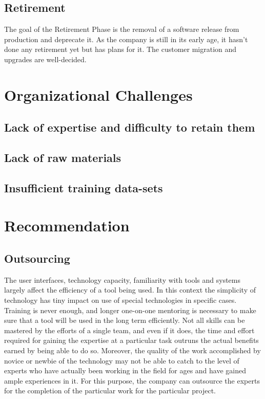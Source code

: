 \documentclass[12pt,a4paper]{scrreprt}
\begin{document}
\section{Retirement}
The goal of the Retirement Phase is the removal of a software release from production and deprecate it. As the company is still in its early age, it hasn't done any retirement yet but has plans for it. The customer migration and upgrades are well-decided.
\chapter{Organizational Challenges}
\section{Lack of expertise and difficulty to retain them}
\section{Lack of raw materials}
\section{Insufficient training data-sets}

\chapter{Recommendation}
\section{Outsourcing} 
The user interfaces, technology capacity, familiarity with tools and systems largely affect the efficiency of a tool being used. In this context the simplicity of technology has tiny impact on use of special technologies in specific cases.  Training is never enough, and longer one-on-one mentoring is necessary to make sure that a tool will be used in the long term efficiently. Not all skills can be mastered by the efforts of a single team, and even if it does, the time and effort required for gaining the expertise at a particular task outruns the actual benefits earned by being able to do so. Moreover, the quality of the work accomplished by novice or newbie of the technology may not be able to catch to the level of experts who have actually been working in the field for ages and have gained ample experiences in it. For this purpose, the company can outsource the experts for the completion of the particular work for the particular project. 
\end{document}
